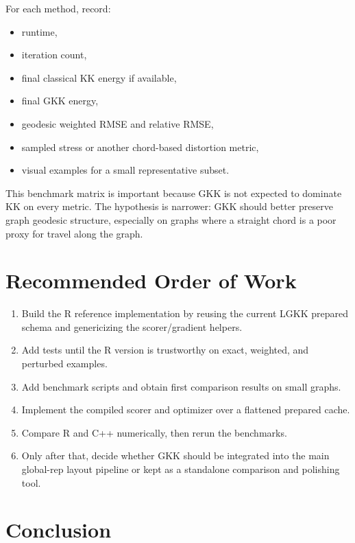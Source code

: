 \documentclass[11pt]{article}
\begin{document}
For each method, record:
\begin{itemize}[leftmargin=1.5em]
\item runtime,
\item iteration count,
\item final classical KK energy if available,
\item final GKK energy,
\item geodesic weighted RMSE and relative RMSE,
\item sampled stress or another chord-based distortion metric,
\item visual examples for a small representative subset.
\end{itemize}

This benchmark matrix is important because GKK is not expected to dominate KK on
every metric. The hypothesis is narrower: GKK should better preserve graph
geodesic structure, especially on graphs where a straight chord is a poor proxy
for travel along the graph.

\section{Recommended Order of Work}

\begin{enumerate}[leftmargin=1.5em]
\item Build the R reference implementation by reusing the current LGKK prepared
schema and genericizing the scorer/gradient helpers.

\item Add tests until the R version is trustworthy on exact, weighted, and
perturbed examples.

\item Add benchmark scripts and obtain first comparison results on small graphs.

\item Implement the compiled scorer and optimizer over a flattened prepared cache.

\item Compare R and C++ numerically, then rerun the benchmarks.

\item Only after that, decide whether GKK should be integrated into the main
global-rep layout pipeline or kept as a standalone comparison and polishing
tool.
\end{enumerate}

\section{Conclusion}
\end{document}
